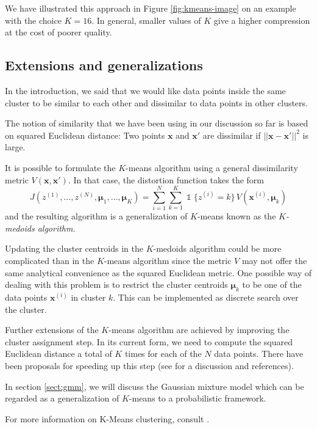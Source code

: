 \documentclass[final,3p,times,twocolumn]{elsarticle}
\let\bs\boldsymbol
\DeclareMathOperator*{\id}{\mathds{1}}
\begin{document}
We have illustrated this approach in Figure \ref{fig:kmeans-image} on an example with the choice $K=16$.
In general, smaller values of $K$ give a higher compression at the cost of poorer quality.

\subsection{Extensions and generalizations}
\label{sect:kmeans-concl}
In the introduction, we said that we would like data points inside the same cluster to be similar to each other and dissimilar to data points in other clusters.

The notion of similarity that we have been using in our discussion so far is based on squared Euclidean distance:
Two points $\bs x$ and $\bs x'$ are dissimilar if $||\bs x-\bs x'||^2$ is large.

It is possible to formulate the $K$-means algorithm using a general dissimilarity metric $V(\boldsymbol x, \boldsymbol x')$.
In that case, the distortion function takes the form
\begin{equation}
\label{eqn:kmedoid-distortion}
J(z^{(1)},\dots,z^{(N)},\bs \mu_1,\dots,\bs \mu_K) = \sum_{i=1}^N \sum_{k=1}^K \id\{z^{(i)}=k\}\,V(\bs x^{(i)}, \bs \mu_k)
\end{equation}
and the resulting algorithm is a generalization of $K$-means known as the \emph{$K$-medoids algorithm}.

Updating the cluster centroids in the $K$-medoids algorithm could be more complicated than in the $K$-means algorithm since the metric $V$ may not offer the same analytical convenience as the squared Euclidean metric.
One possible way of dealing with this problem is to restrict the cluster centroids $\bs\mu_k$ to be one of the data points $\bs x^{(i)}$ in cluster $k$.
This can be implemented as discrete search over the cluster.

Further extensions of the $K$-means algorithm are achieved by improving the cluster assignment step.
In its current form, we need to compute the squared Euclidean distance a total of $K$ times for each of the $N$ data points.
There have been proposals for speeding up this step (see \cite{Bishop} for a discussion and references).

In section \ref{sect:gmm}, we will discuss the Gaussian mixture model which can be regarded as a generalization of $K$-means to a probabilistic framework.

For more information on K-Means clustering, consult \cite{Bishop,Murphy}.
\end{document}
